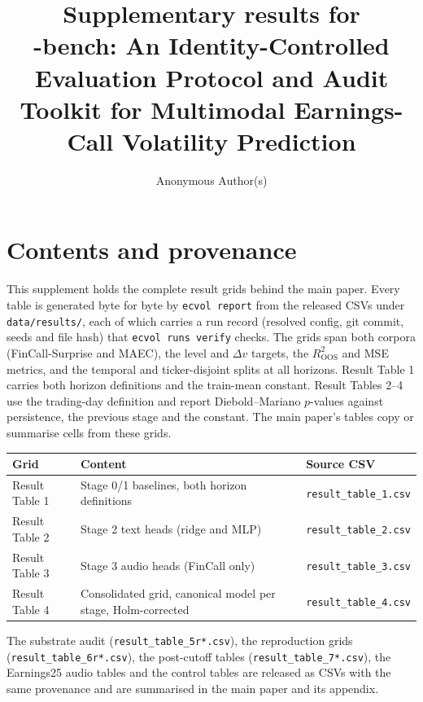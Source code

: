 \documentclass[10pt]{article}
\title{Supplementary results for\\
       \ecvol-bench: An Identity-Controlled Evaluation Protocol and Audit\\
       Toolkit for Multimodal Earnings-Call Volatility Prediction}
\author{Anonymous Author(s)}
\date{}
\newcommand{\Rtwo}{\ensuremath{R^2_{\mathrm{OOS}}}\xspace}
\newcommand{\dv}{\ensuremath{\Delta v}\xspace}
\newcommand{\tickerdisjoint}{ticker-disjoint\xspace}
\begin{document}
\maketitle

\section*{Contents and provenance}

This supplement holds the complete result grids behind the main paper. Every
table is generated byte for byte by \texttt{ecvol report} from the released CSVs
under \texttt{data/results/}, each of which carries a run record (resolved config,
git commit, seeds and file hash) that \texttt{ecvol runs verify} checks. The grids
span both corpora (FinCall-Surprise and MAEC), the level and \dv{} targets, the
\Rtwo{} and MSE metrics, and the temporal and \tickerdisjoint{} splits at all
horizons. Result Table 1 carries both horizon definitions and the train-mean
constant. Result Tables 2--4 use the trading-day definition and report
Diebold--Mariano $p$-values against persistence, the previous stage and the
constant. The main paper's tables copy or summarise cells from these grids.

\begin{center}
\small
\begin{tabular}{lll}
\toprule
Grid & Content & Source CSV \\
\midrule
Result Table 1 & Stage 0/1 baselines, both horizon definitions & \texttt{result\_table\_1.csv} \\
Result Table 2 & Stage 2 text heads (ridge and MLP) & \texttt{result\_table\_2.csv} \\
Result Table 3 & Stage 3 audio heads (FinCall only) & \texttt{result\_table\_3.csv} \\
Result Table 4 & Consolidated grid, canonical model per stage, Holm-corrected & \texttt{result\_table\_4.csv} \\
\bottomrule
\end{tabular}
\end{center}

The substrate audit (\texttt{result\_table\_5r*.csv}), the reproduction grids
(\texttt{result\_table\_6r*.csv}), the post-cutoff tables
(\texttt{result\_table\_7*.csv}), the Earnings25 audio tables and the control
tables are released as CSVs with the same provenance and are summarised in the
main paper and its appendix.

\clearpage
\end{document}
